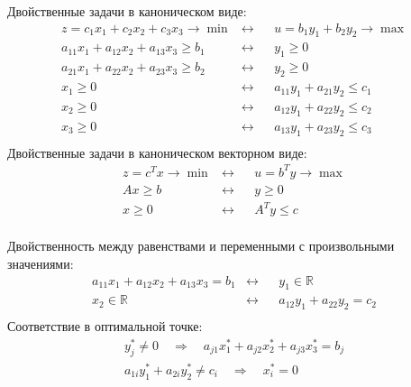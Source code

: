 \documentclass[12pt, a4paper]{article}
\renewcommand{\leq}{\leqslant}
\renewcommand{\geq}{\geqslant}
\newcommand{\RR}{\mathbb{R}}
\begin{document}
\begin{leftbar}
  \noindent
  Двойственные задачи в каноническом виде:
  \begin{align*}
    &z = c_1 x_1 + c_2 x_2 + c_3 x_3 \to \min & \leftrightarrow && u = b_1 y_1 + b_2 y_2 \to \max & \\
    &a_{11} x_1 + a_{12} x_2 + a_{13} x_3 \geq b_1 & \leftrightarrow && y_1 \geq 0 &\\
    &a_{21} x_1 + a_{22} x_2 + a_{23} x_3  \geq  b_2 & \leftrightarrow && y_2 \geq 0 &\\
    &x_1 \geq 0 & \leftrightarrow && a_{11} y_1 + a_{21} y_2 \leq c_1 & \\
    &x_2 \geq 0 & \leftrightarrow && a_{12} y_1 + a_{22} y_2 \leq c_2 & \\
    &x_3 \geq 0 & \leftrightarrow && a_{13} y_1 + a_{23} y_2 \leq c_3 & \\
  \end{align*}
  Двойственные задачи в каноническом векторном виде:
  \begin{align*}
    &z = c^T x \to \min & \leftrightarrow && u = b^T y \to \max & \\
    & A x \geq b & \leftrightarrow && y \geq 0 &\\
    &x \geq 0 & \leftrightarrow && A^T y \leq c & \\
  \end{align*}


  Двойственность между равенствами и переменными с произвольными значениями:
  \begin{align*}
    &a_{11} x_1 + a_{12} x_2 + a_{13} x_3 = b_1 & \leftrightarrow && y_1 \in \RR &\\
    &x_2 \in \RR & \leftrightarrow && a_{12} y_1 + a_{22} y_2 = c_2 & \\
  \end{align*}
  Соответствие в оптимальной точке:
  \begin{align*}
    y_j^* \neq 0 \quad \Rightarrow \quad a_{j1} x_1^* + a_{j2} x_2^* + a_{j3} x_3^* = b_j  \\
    a_{1i} y_1^* + a_{2i} y_2^* \neq c_i \quad \Rightarrow \quad x_i^* = 0 \\
  \end{align*}  
\end{leftbar}
\end{document}
